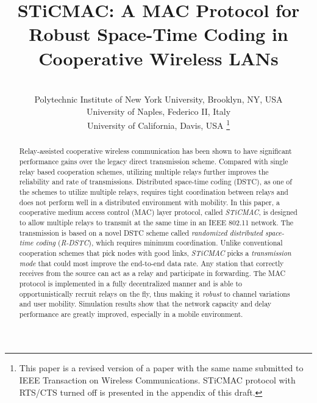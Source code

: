 \documentclass[peerreview,draftcls,onecolumn,12pt,a4paper]{IEEEtran}
\begin{document}
\title{STiCMAC: A MAC Protocol for Robust Space-Time Coding in Cooperative Wireless LANs}

\author{
\\
\authorblockA
{\small  Polytechnic Institute of New York University,
Brooklyn, NY, USA\\} {\small  University of Naples,
Federico II, Italy \\} {\small  University of
California, Davis, USA}
\thanks{This paper is a revised version of a paper with the same name submitted to IEEE Transaction on Wireless Communications. STiCMAC protocol with RTS/CTS turned off is presented in the appendix of this draft.
}
}

\maketitle


\begin{abstract}

Relay-assisted cooperative wireless communication has been shown to have significant performance gains over the legacy direct transmission scheme. Compared with single relay based cooperation schemes, utilizing multiple relays further improves the reliability and rate of transmissions. Distributed space-time coding (DSTC), as one of the schemes to utilize multiple relays, requires tight coordination between relays and does not perform well in a distributed environment with mobility. In this paper, a cooperative medium access control (MAC) layer protocol, called \emph{STiCMAC}, is designed to allow multiple relays to transmit at the same time in an IEEE 802.11 network. The transmission is based on a novel DSTC scheme called \emph{randomized distributed space-time coding} (\emph{R-DSTC}), which requires minimum coordination. Unlike conventional cooperation schemes that pick nodes with good links, \emph{STiCMAC} picks a \emph{transmission mode} that could most improve the end-to-end data rate. Any station that correctly receives from the source can act as a relay and participate in forwarding. The MAC protocol is implemented in a fully decentralized manner and is able to opportunistically recruit relays on the fly, thus making it \emph{robust} to channel variations and user mobility. Simulation results show that the network capacity and delay performance are greatly improved, especially in a mobile environment.
\end{abstract}
\end{document}
